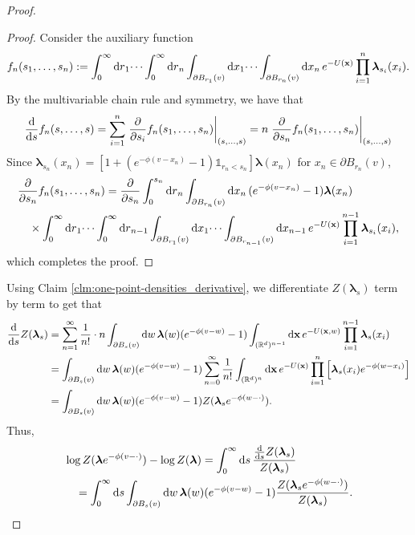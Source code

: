 \documentclass[11pt]{article}
\newcommand{\R}{\mathbb R}
\newcommand{\bl}{\bm{\lambda}}
\newcommand{\bx}{\vb{x}}
\newcommand{\indicator}[1]{\mathds{1}_{#1}}
\numberwithin{equation}{section}
\theoremstyle{plain}
\theoremstyle{definition}
\theoremstyle{remark}
\begin{document}
\begin{proof}
\begin{proof}
Consider the auxiliary function 
\begin{equation}
f_{n}(s_{1},\dots,s_{n})
:=\int_{0}^{\infty}\dd{r}_{1}\dots\int_{0}^{\infty}\dd{r}_{n}\int_{\partial B_{r_{1}}(v)}\dd{x}_{1}\dots\int_{\partial B_{r_{n}}(v)}\dd{x}_{n} e^{-U(\bx)}\prod_{i=1}^{n}\bl_{s_{i}}(x_{i}).
\end{equation}
By the multivariable chain rule and symmetry, we have that
\begin{equation}
\dv{s}f_{n}(s,\dots,s)
=\sum_{i=1}^{n}\eval{\pdv{s_{i}}f_{n}(s_{1},\dots,s_{n})}_{(s,\dots,s)}
=n\eval{\pdv{s_{n}}f_{n}(s_{1},\dots,s_{n})}_{(s,\dots,s)}
\end{equation}
Since $\bl_{s_{n}}(x_{n})=\left[1+(e^{-\phi(v-x_{n})}-1)\indicator{r_{n}<s_{n}}\right]\bl(x_{n})$ for $x_{n}\in\partial B_{r_{n}}(v)$,
\begin{equation}
\begin{multlined}
\pdv{s_{n}}f_{n}(s_{1},\dots,s_{n})
=\pdv{s_{n}}
\int_{0}^{s_{n}}\dd{r}_{n}\int_{\partial B_{r_{n}}(v)}\dd{x}_{n}(e^{-\phi(v-x_{n})}-1)\bl(x_{n})
\\
\times
\int_{0}^{\infty}\dd{r}_{1}\dots\int_{0}^{\infty}\dd{r}_{n-1}
\int_{\partial B_{r_{1}}(v)}\dd{x}_{1}\dots\int_{\partial B_{r_{n-1}}(v)}\dd{x}_{n-1}
e^{-U(\bx)}\prod_{i=1}^{n-1}\bl_{s_{i}}(x_{i}),
\end{multlined}
\end{equation}
which completes the proof.
\end{proof}

Using Claim \ref{clm:one-point-densities_derivative}, we differentiate $Z(\bl_{s})$ term by term to get that
\begin{equation}
\begin{split}
\dv{s}Z(\bl_{s}){}
&=\sum_{n=1}^{\infty}\frac{1}{n!}\cdot n\int_{\partial B_{s}(v)}\dd{w}\bl(w)(e^{-\phi(v-w)}-1)\int_{(\R^{d})^{n-1}}\dd{\vb{x}} e^{-U(\bx,w)}\prod_{i=1}^{n-1}\bl_{s}(x_{i}) \\
{}&=\int_{\partial B_{s}(v)}\dd{w}\bl(w)(e^{-\phi(v-w)}-1)\sum_{n=0}^{\infty}\frac{1}{n!}\int_{(\R^{d})^{n}}\dd{\vb{x}} e^{-U(\bx)}\prod_{i=1}^{n}\left[\bl_{s}(x_{i})e^{-\phi(w-x_{i})}\right] \\
{}&=\int_{\partial B_{s}(v)}\dd{w}\bl(w)(e^{-\phi(v-w)}-1)Z(\bl_{s}e^{-\phi(w-\cdot)}).
\end{split}
\end{equation}
Thus,
\begin{equation}
\label{eqn:complex-contraction_recursion_preliminary-log-Z-difference}
\begin{multlined}
\log Z(\bl e^{-\phi(v-\cdot)})-\log Z(\bl)
=\int_{0}^{\infty}\dd{s}\frac{\dv{s}Z(\bl_{s})}{Z(\bl_{s})} 
\\
=\int_{0}^{\infty}\dd{s}\int_{\partial B_{s}(v)}\dd{w}\bl(w)(e^{-\phi(v-w)}-1)\frac{Z(\bl_{s}e^{-\phi(w-\cdot)})}{Z(\bl_{s})}.
\end{multlined}
\end{equation}


\end{proof}
\end{document}
